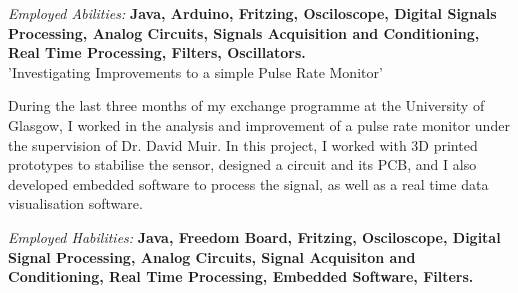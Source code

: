 \documentclass[a4paper]{twentysecondcv} %
\begin{document}
\begin{twenty}
{\hspace{8pt}\textit{Employed Abilities: }\textbf{Java, Arduino, Fritzing, Osciloscope, Digital Signals Processing, Analog Circuits, Signals Acquisition and Conditioning, Real Time Processing, Filters, Oscillators.}
}\\


{'Investigating Improvements to a simple Pulse Rate Monitor'}
{}
{\hspace{8pt}During the last three months of my exchange programme at the University of Glasgow, I worked in the analysis and improvement of a pulse rate monitor under the supervision of Dr. David Muir. In this project, I worked with 3D printed prototypes to stabilise the sensor, designed a circuit and its PCB, and I also developed embedded software to process the signal, as well as a real time data visualisation software.

\hspace{8pt}\textit{Employed Habilities:} \textbf{Java, Freedom Board, Fritzing, Osciloscope, Digital Signal Processing, Analog Circuits, Signal Acquisiton and Conditioning, Real Time Processing, Embedded Software, Filters.}}
\end{twenty}
\end{document}
